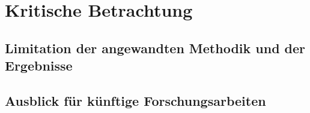 \newpage
\section{Kritische Betrachtung}
\subsection{Limitation der angewandten Methodik und der Ergebnisse}
\subsection{Ausblick für künftige Forschungsarbeiten}